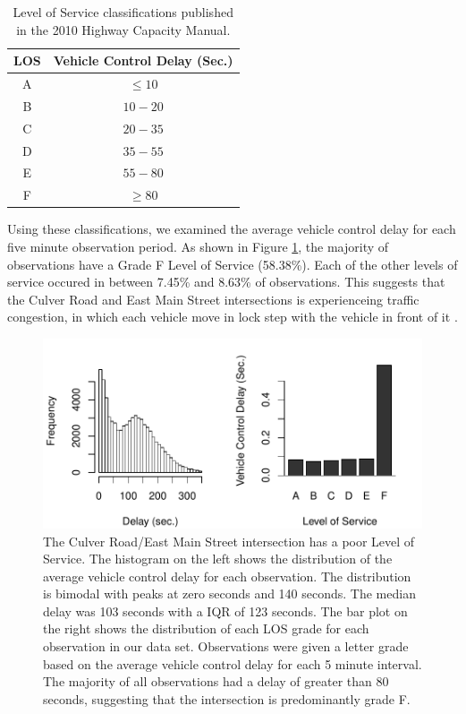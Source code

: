 \documentclass{report}
\begin{document}
\begin{table}[h]
\centering
\caption{Level of Service classifications published in the 2010 Highway Capacity
Manual.}
\begin{tabular}{c | c}
\textbf{LOS} & \textbf{Vehicle Control Delay (Sec.)}\\\hline
A & $\le 10$\\
B & $10 - 20 $\\
C & $20 - 35$\\
D & $35 - 55$\\
E & $55 - 80$\\
F & $\ge 80$\\
\end{tabular}
\label{LOStable}
\end{table}

Using these classifications, we examined the average vehicle control delay for
each five minute observation period. As shown in Figure \ref{fig:LOSfigure},
the majority of observations have a Grade F Level of Service (58.38\%). Each of
the other levels of service occured in between 7.45\% and 8.63\% of observations.
This suggests that the Culver Road and East Main Street intersections is
experienceing traffic congestion, in which each vehicle move in lock step with
the vehicle in front of it \cite{HCM}.

\begin{figure}[h]
\centering
\includegraphics{upstat_report-LOCplot}
\caption{ The Culver Road/East Main Street
intersection has a poor Level of Service. The histogram on the left shows the
distribution of the average vehicle control delay for each observation. The
distribution is bimodal with peaks at zero seconds and 140 seconds. The median
delay was 103 seconds with a IQR of
123 seconds. The bar plot on the right shows the
distribution of each LOS grade for each observation in our data set.
Observations were given a letter grade based on the average vehicle control
delay for each 5 minute interval. The majority of all observations had a delay
of greater than 80 seconds, suggesting that the intersection is predominantly grade
F.}
\label{fig:LOSfigure}
\end{figure}
\end{document}
